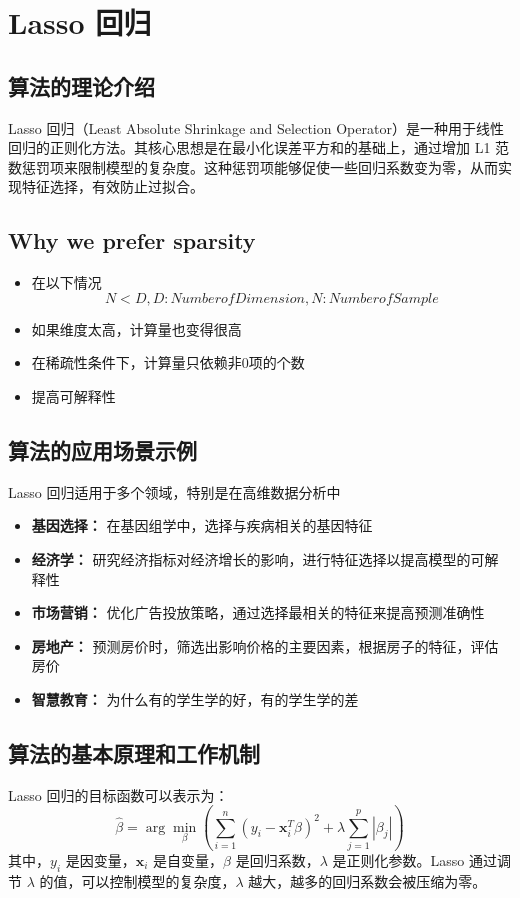 \section{Lasso 回归}
\subsection*{算法的理论介绍}
Lasso 回归（Least Absolute Shrinkage and Selection Operator）是一种用于线性回归的正则化方法。其核心思想是在最小化误差平方和的基础上，通过增加 L1 范数惩罚项来限制模型的复杂度。这种惩罚项能够促使一些回归系数变为零，从而实现特征选择，有效防止过拟合。

\subsection*{Why we prefer sparsity}

\begin{itemize}
    \item 在以下情况$$N<D, D: Number of Dimension, N: Number of Sample$$
    \item 如果维度太高，计算量也变得很高
    \item 在稀疏性条件下，计算量只依赖非0项的个数
    \item 提高可解释性
\end{itemize}

\subsection*{算法的应用场景示例}
Lasso 回归适用于多个领域，特别是在高维数据分析中
\begin{itemize}
    \item \textbf{基因选择：} 在基因组学中，选择与疾病相关的基因特征
    \item \textbf{经济学：} 研究经济指标对经济增长的影响，进行特征选择以提高模型的可解释性
    \item \textbf{市场营销：} 优化广告投放策略，通过选择最相关的特征来提高预测准确性
    \item \textbf{房地产：} 预测房价时，筛选出影响价格的主要因素，根据房子的特征，评估房价
    \item \textbf{智慧教育：} 为什么有的学生学的好，有的学生学的差
\end{itemize}

\subsection*{算法的基本原理和工作机制}
Lasso 回归的目标函数可以表示为：
\[
    \hat{\beta} = \arg \min_\beta \left( \sum_{i=1}^{n} (y_i - \mathbf{x}_i^T \beta)^2 + \lambda \sum_{j=1}^{p} |\beta_j| \right)
\]
其中，\(y_i\) 是因变量，\(\mathbf{x}_i\) 是自变量，\(\beta\) 是回归系数，\(\lambda\) 是正则化参数。Lasso 通过调节 \(\lambda\) 的值，可以控制模型的复杂度，\(\lambda\) 越大，越多的回归系数会被压缩为零。


